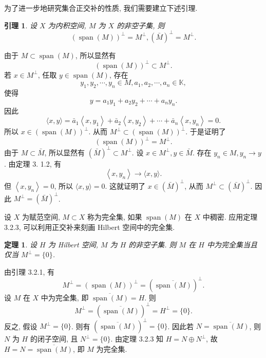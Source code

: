 \documentclass[openany]{ctexbook}
\makeatletter
\theoremstyle{kaiti}
\newtheorem{theorem}{定理}[section]
\newtheorem{lemma}{引理}[section]
\theoremstyle{normal}
\renewenvironment{proof}[1][\proofname]{\par
    \pushQED{\qed}%
    \normalfont \topsep6\p@\@plus6\p@\relax
    \trivlist
    \item\relax
    {\heiti #1}\hspace{2\labelsep}\ignorespaces
  }{%
    \popQED\endtrivlist\@endpefalse
  }
\makeatother
\begin{document}
为了进一步地研究集合正交补的性质, 我们需要建立下述引理.

\begin{lemma}
  设 $X$ 为内积空间, $M$ 为 $X$ 的非空子集, 则
  $$
  (\operatorname{span}(M))^{\perp}=M^{\perp},(\bar{M})^{\perp}=M^{\perp}.
  $$
\end{lemma}

\begin{proof}
由于 $M \subset \operatorname{span}(M)$, 所以显然有
$$
(\operatorname{span}(M))^{\perp} \subset M^{\perp}.
$$
若 $x \in M^{\perp}$, 任取 $y \in \operatorname{span}(M)$, 存在
$$
y_1, y_2, \cdots, y_n \in M, a_1, a_2, \cdots, a_n \in \mathbb{K},
$$
使得
$$
y=a_1 y_1+a_2 y_2+\cdots+a_n y_n.
$$
因此
$$
\langle x, y\rangle=\bar{a}_1\left\langle x, y_1\right\rangle+\bar{a}_2\left\langle x, y_2\right\rangle+\cdots+\bar{a}_n\left\langle x, y_n\right\rangle=0.
$$
所以 $x \in(\operatorname{span}(M))^{\perp}$. 从而 $M^{\perp} \subset(\operatorname{span}(M))^{\perp}$. 于是证明了
$$
(\operatorname{span}(M))^{\perp}=M^{\perp}.
$$
由于 $M \subset \bar{M}$, 所以显然有 $(\bar{M})^{\perp} \subset M^{\perp}$. 设 $x \in M^{\perp}, y \in \bar{M}$. 存在 $y_n \in M, y_n \rightarrow y$. 由定理 3. 1.2, 有
$$
\left\langle x, y_n\right\rangle \rightarrow\langle x, y\rangle.
$$
但 $\left\langle x, y_n\right\rangle=0$, 所以 $\langle x, y\rangle=0$. 这就证明了 $x \in(\bar{M})^{\perp}$, 从而 $M^{\perp} \subset(\bar{M})^{\perp}$. 因此 $M^{\perp}=(\bar{M})^{\perp}$.
\end{proof}

设 $X$ 为赋范空间, $M \subset X$ 称为完全集, 如果 $\operatorname{span}(M)$ 在 $X$ 中稠密. 应用定理 3.2.3, 可以利用正交补来刻画 Hilbert 空间中的完全集.

\begin{theorem}
  设 $H$ 为 Hilbert 空间, $M$ 为 $H$ 的非空子集. 则 $M$ 在 $H$ 中为完全集当且仅当 $M^{\perp}=\{0\}$.
\end{theorem}

\begin{proof}
由引理 3.2.1, 有
$$
M^{\perp}=(\operatorname{span}(M))^{\perp}=(\overline{\operatorname{span}(M)})^{\perp}.
$$
设 $M$ 在 $X$ 中为完全集, 即 $\overline{\operatorname{span}(M)}=H$. 则
$$
M^{\perp}=(\overline{\operatorname{span}(M)})^{\perp}=H^{\perp}=\{0\}.
$$
反之, 假设 $M^{\perp}=\{0\}$. 则有 $(\overline{\operatorname{span}(M)})^{\perp}=\{0\}$. 因此若 $N=\overline{\operatorname{span}(M)}$, 则 $N$ 为 $H$ 的闭子空间, 且 $N^{\perp}=\{0\}$. 由定理 3.2.3 知 $H=N \oplus N^{\perp}$, 故 $H=N=\overline{\operatorname{span}(M)}$, 即 $M$ 为完全集.
\end{proof}
\end{document}
